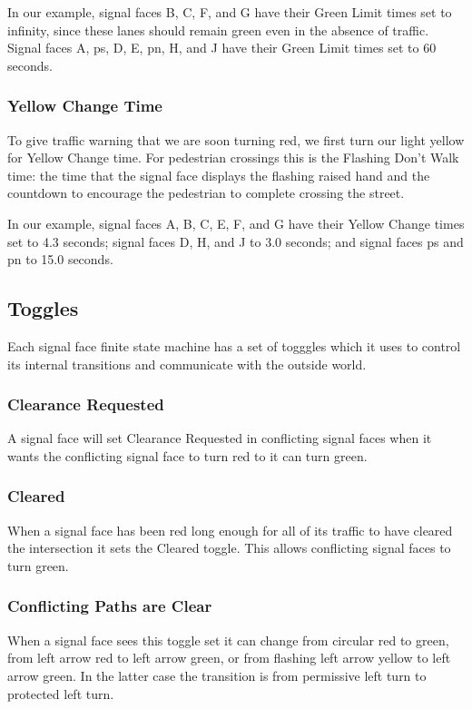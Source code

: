 \documentclass[letterpaper,twoside]{article}
\begin{document}
In our example, signal faces B, C, F, and G have their Green Limit times
set to infinity, since these lanes should remain green even in the absence
of traffic.  Signal faces A, ps, D, E, pn, H, and J have their Green Limit
times set to 60 seconds.

\subsubsection{Yellow Change Time}
To give traffic warning that we are soon turning red, we first turn our light
yellow for Yellow Change time.  For pedestrian crossings this is the
Flashing Don't Walk time: the time that the signal face displays the flashing
raised hand and the countdown to encourage the pedestrian to complete
crossing the street.

In our example, signal faces A, B, C, E, F, and G have their Yellow Change
times set to 4.3 seconds; signal faces D, H, and J to 3.0 seconds;
and signal faces ps and pn to 15.0 seconds.

\subsection{Toggles}

Each signal face finite state machine has a set of togggles which it uses
to control its internal transitions and communicate with the
outside world.

\subsubsection{Clearance Requested}

A signal face will set Clearance Requested in conflicting signal faces
when it wants the conflicting signal face to turn red to it can turn green.

\subsubsection{Cleared}

When a signal face has been red long enough for all of its traffic
to have cleared the intersection it sets the Cleared toggle.
This allows conflicting signal faces to turn green.

\subsubsection{Conflicting Paths are Clear}

When a signal face sees this toggle set it can change from circular red
to green, from left arrow red to left arrow green, or from flashing
left arrow yellow to left arrow green.
In the latter case the transition is from permissive left turn to
protected left turn.
\end{document}
